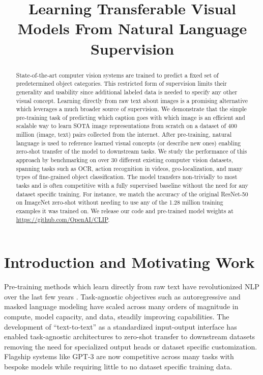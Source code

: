 \title{Learning Transferable Visual Models From Natural Language Supervision}

\begin{abstract}
State-of-the-art computer vision systems are trained to predict a fixed set of predetermined object categories. This restricted form of supervision limits their generality and usability since additional labeled data is needed to specify any other visual concept. Learning directly from raw text about images is a promising alternative which leverages a much broader source of supervision. We demonstrate that the simple pre-training task of predicting which caption goes with which image is an efficient and scalable way to learn SOTA image representations from scratch on a dataset of 400 million (image, text) pairs collected from the internet. After pre-training, natural language is used to reference learned visual concepts (or describe new ones) enabling zero-shot transfer of the model to downstream tasks. We study the performance of this approach by benchmarking on over 30 different existing computer vision datasets, spanning tasks such as OCR, action recognition in videos, geo-localization, and many types of fine-grained object classification. The model transfers non-trivially to most tasks and is often competitive with a fully supervised baseline without the need for any dataset specific training. For instance, we match the accuracy of the original ResNet-50 on ImageNet zero-shot without needing to use any of the 1.28 million training examples it was trained on. We release our code and pre-trained model weights at \url{https://github.com/OpenAI/CLIP}.
\end{abstract}

\section{Introduction and Motivating Work}

Pre-training methods which learn directly from raw text have revolutionized NLP over the last few years \citep{dai2015semi,peters2018deep,howard2018universal,radford2018improving,devlin2018bert,raffel2019exploring}. Task-agnostic objectives such as autoregressive and masked language modeling have scaled across many orders of magnitude in compute, model capacity, and data, steadily improving capabilities. The development of ``text-to-text'' as a standardized input-output interface \citep{mccann2018natural,radford2019language,raffel2019exploring} has enabled task-agnostic architectures to zero-shot transfer to downstream datasets removing the need for specialized output heads or dataset specific customization. Flagship systems like GPT-3 \citep{brown2020language} are now competitive across many tasks with bespoke models while requiring little to no dataset specific training data.

